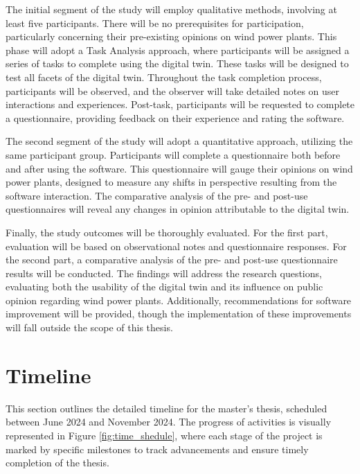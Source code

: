 \documentclass[11pt, titlepage, a4paper]{article}
\begin{document}
\begin{linenumbers}
    The initial segment of the study will employ qualitative methods, involving at least five participants. There will be no prerequisites for participation, particularly concerning their pre-existing opinions on wind power plants. This phase will adopt a Task Analysis approach, where participants will be assigned a series of tasks to complete using the digital twin. These tasks will be designed to test all facets of the digital twin. Throughout the task completion process, participants will be observed, and the observer will take detailed notes on user interactions and experiences. Post-task, participants will be requested to complete a questionnaire, providing feedback on their experience and rating the software.

    The second segment of the study will adopt a quantitative approach, utilizing the same participant group. Participants will complete a questionnaire both before and after using the software. This questionnaire will gauge their opinions on wind power plants, designed to measure any shifts in perspective resulting from the software interaction. The comparative analysis of the pre- and post-use questionnaires will reveal any changes in opinion attributable to the digital twin.

    Finally, the study outcomes will be thoroughly evaluated. For the first part, evaluation will be based on observational notes and questionnaire responses. For the second part, a comparative analysis of the pre- and post-use questionnaire results will be conducted. The findings will address the research questions, evaluating both the usability of the digital twin and its influence on public opinion regarding wind power plants. Additionally, recommendations for software improvement will be provided, though the implementation of these improvements will fall outside the scope of this thesis.


    \section{Timeline}
    This section outlines the detailed timeline for the master's thesis, scheduled between June 2024 and November 2024.
    The progress of activities is visually represented in Figure \ref{fig:time_shedule}, where each stage of the project is marked by specific milestones to track advancements and ensure timely completion of the thesis.


\end{linenumbers}
\end{document}
